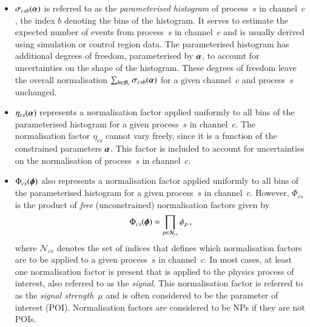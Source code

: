 \begin{itemize}

\item $\sigma_{csb}(\myvec{\alpha})$ is referred to as the \emph{parameterised
    histogram} of process~$s$ in channel~$c$, the index $b$ denoting the bins of
  the histogram. It serves to estimate the expected number of events from
  process~$s$ in channel~$c$ and is usually derived using simulation or control
  region data. The parameterised histogram has additional degrees of freedom,
  parameterised by $\myvec{\alpha}$, to account for uncertainties on the shape
  of the histogram. These degrees of freedom leave the overall normalisation
  $\sum_{b \in \mathcal{B}_{c}} \sigma_{csb}(\myvec{\alpha})$ for a given
  channel~$c$ and process~$s$ unchanged.

\item $\eta_{cs}(\myvec{\alpha})$ represents a normalisation factor applied
  uniformly to all bins of the parameterised histogram for a given process~$s$
  in channel~$c$. The normalisation factor $\eta_{cs}$ cannot vary freely, since
  it is a function of the constrained parameters $\myvec{\alpha}$. This factor
  is included to account for uncertainties on the normalisation of process~$s$
  in channel~$c$.

\item $\Phi_{cs}(\myvec{\phi})$ also represents a normalisation factor applied
  uniformly to all bins of the parameterised histogram for a given process~$s$
  in channel~$c$. However, $\Phi_{cs}$ is the product of \emph{free}
  (unconstrained) normalisation factors given by
  \begin{align*}
    \Phi_{cs}(\myvec{\phi}) = \prod_{p \in \mathcal{N}_{cs}} \phi_p \,\text{,}
  \end{align*}
  where $\mathcal{N}_{cs}$ denotes the set of indices that defines which
  normalisation factors are to be applied to a given process~$s$ in channel~$c$.
  In most cases, at least one normalisation factor is present that is applied to
  the physics process of interest, also referred to as the \emph{signal}. This
  normalisation factor is referred to as the \emph{signal strength}~$\mu$ and is
  often considered to be the parameter of interest (POI). Normalisation factors
  are considered to be NPs if they are not POIs.


\end{itemize}
